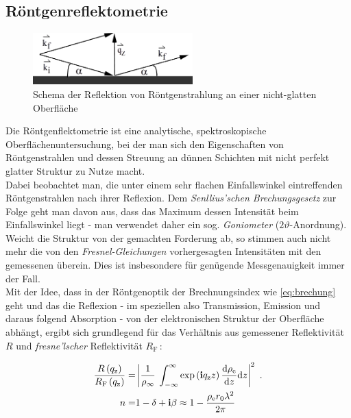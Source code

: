 \documentclass[numbers=noenddot,a4paper,notitlepage,twoside,BCOR15mm]{scrartcl}
\newcommand{\diff}{\textnormal{d}}
\newcommand{\ix}[1]{_\text{#1}}
\newcommand{\imag}{\mathbf{i}}
\newcommand{\tilt}[1]{\textit{#1}}
\begin{document}
		\subsection{Röntgenreflektometrie}\label{subsec:röntgen}

				\begin{figure}[t]
					\centering
					\includegraphics[width=0.55\textwidth]{rontgen2.png}
					\caption{Schema der Reflektion von Röntgenstrahlung an einer nicht-glatten Oberfläche \cite{EMAUGreifswaldMIE}}
				\end{figure}

			Die Röntgenflektometrie ist eine analytische, spektroskopische Oberflächenuntersuchung, bei der man sich den Eigenschaften von Röntgenstrahlen und dessen Streuung an dünnen Schichten mit nicht perfekt glatter Struktur zu Nutze macht.\\
			Dabei beobachtet man, die unter einem sehr flachen Einfallswinkel eintreffenden Röntgenstrahlen nach ihrer Reflexion. Dem \tilt{Senllius'schen Brechungsgesetz} zur Folge geht man davon aus, dass das Maximum dessen Intensität beim Einfallswinkel liegt - man verwendet daher ein sog. \tilt{Goniometer} ($2\vartheta$-Anordnung). Weicht die Struktur von der gemachten Forderung ab, so stimmen auch nicht mehr die von den \tilt{Fresnel-Gleichungen} vorhergesagten Intensitäten mit den gemessenen überein. Dies ist insbesondere für genügende Messgenauigkeit immer der Fall.\\
			Mit der Idee, dass in der Röntgenoptik der Brechnungsindex wie \autoref{eq:brechung} geht und das die Reflexion - im speziellen also Transmission, Emission und daraus folgend Absorption - von der elektronischen Struktur der Oberfläche abhängt, ergibt sich grundlegend für das Verhältnis aus gemessener Reflektivität $R$ und \tilt{fresne'lscher} Reflektivität $R\ix{F}$\,:

				\begin{align}
					\frac{R\left(q\ix{z}\right)}{R\ix{F}\left(q\ix{z}\right)}=&\left|\frac{1}{\rho\ix{$\infty$}}\right.\left.\int_{-\infty}^{\infty}\exp\left(\imag q\ix{z}z\right)\frac{\diff \rho\ix{e}}{\diff z}\diff z\right|^2\,\,. \label{eq:edichte}\\
					n=&1-\delta+\imag\beta\approx 1-\frac{\rho\ix{e}r\ix{0}\lambda^2}{2\pi} \label{eq:brechung}
				\end{align}
\end{document}
